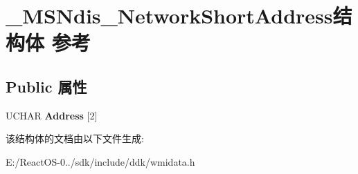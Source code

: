 \hypertarget{struct___m_s_ndis___network_short_address}{}\section{\+\_\+\+M\+S\+Ndis\+\_\+\+Network\+Short\+Address结构体 参考}
\label{struct___m_s_ndis___network_short_address}
\subsection*{Public 属性}
\begin{DoxyCompactItemize}
\item 
\mbox{\label{struct___m_s_ndis___network_short_address_ab6c6ced48916767343ffaed14768c1c2}} 
U\+C\+H\+AR {\bfseries Address} \mbox{[}2\mbox{]}
\end{DoxyCompactItemize}


该结构体的文档由以下文件生成\+:\begin{DoxyCompactItemize}
\item 
E\+:/\+React\+O\+S-\/0../sdk/include/ddk/wmidata.\+h\end{DoxyCompactItemize}
